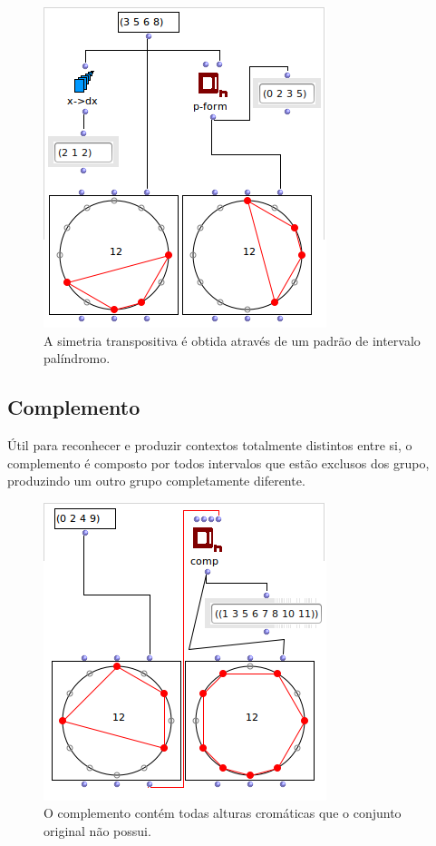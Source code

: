 \documentclass[
	12pt,				%
	openright,			%
	twoside,			%
	a4paper,			%
	english,			%
	french,				%
	spanish,			%
	brazil				%
	]{abntex2}
\begin{document}
\begin{apendicesenv}
\begin{figure}[!h]
	\caption{\label{fig_grafico}A simetria transpositiva é obtida através de um padrão de intervalo palíndromo. }
	\begin{center}
	    \includegraphics[scale=0.6]{OM_settheory/palindrome1.png}
	\end{center}
\end{figure}

\subsection{Complemento}

Útil para reconhecer e produzir contextos totalmente distintos entre si, o complemento é composto por todos intervalos que estão exclusos dos grupo, produzindo um outro grupo completamente diferente.


\begin{figure}[!h]
	\caption{\label{fig_grafico}O complemento contém todas alturas cromáticas que o conjunto original não possui. }
	\begin{center}
	    \includegraphics[scale=0.6]{OM_settheory/complemento.png}
	\end{center}
\end{figure}



\end{apendicesenv}
\end{document}
